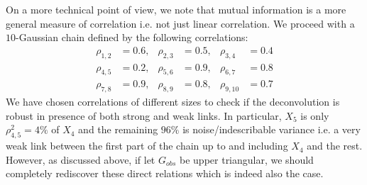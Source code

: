 \documentclass[../Thesis.tex]{subfiles}
\begin{document}
On a more technical point of view, we note that mutual information is a more general measure of correlation i.e. not just linear correlation. We proceed with a $10$-Gaussian chain defined by the following correlations:
\begin{equation}\label{eq:Example Gaussian chain}
    \begin{aligned}
        \rho_{1,2} & = 0.6, & \rho_{2,3} & = 0.5, & \rho_{3,4}  & = 0.4 \\
        \rho_{4,5} & = 0.2, & \rho_{5,6} & = 0.9, & \rho_{6,7}  & = 0.8 \\
        \rho_{7,8} & = 0.9, & \rho_{8,9} & = 0.8, & \rho_{9,10} & = 0.7
    \end{aligned}
\end{equation}
We have chosen correlations of different sizes to check if the deconvolution is robust in presence of both strong and weak links. In particular, $X_5$ is only $\rho_{4,5}^2 = 4\%$ of $X_4$ and the remaining $96\%$ is noise/indescribable variance i.e. a very weak link between the first part of the chain up to and including $X_4$ and the rest. However, as discussed above, if let $G_{obs}$ be upper triangular, we should completely rediscover these direct relations which is indeed also the case.
\end{document}
